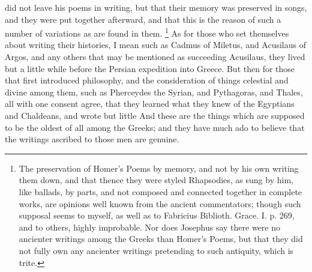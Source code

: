 did not leave his poems in writing, but that their memory was preserved in
songs, and they were put together afterward, and that this is the reason
of such a number of variations as are found in them. \footnote{The preservation of Homer's
Poems by memory, and not by his own writing them down, and that thence
they were styled Rhapsodies, as sung by him, like ballads, by parts, and
not composed and connected together in complete works, are opinions well
known from the ancient commentators; though such supposal seems to myself,
as well as to Fabricius Biblioth. Grace. I. p. 269, and to others, highly
improbable. Nor does Josephus say there were no ancienter writings among
the Greeks than Homer's Poems, but that they did not fully own any
ancienter writings pretending to such antiquity, which is trite.} As for those
who set themselves about writing their histories, I mean such as Cadmus of
Miletus, and Acusilaus of Argos, and any others that may be mentioned as
succeeding Acusilaus, they lived but a little while before the Persian
expedition into Greece. But then for those that first introduced
philosophy, and the consideration of things celestial and divine among
them, such as Pherceydes the Syrian, and Pythagoras, and Thales, all with
one consent agree, that they learned what they knew of the Egyptians and
Chaldeans, and wrote but little And these are the things which are
supposed to be the oldest of all among the Greeks; and they have much ado
to believe that the writings ascribed to those men are genuine.

